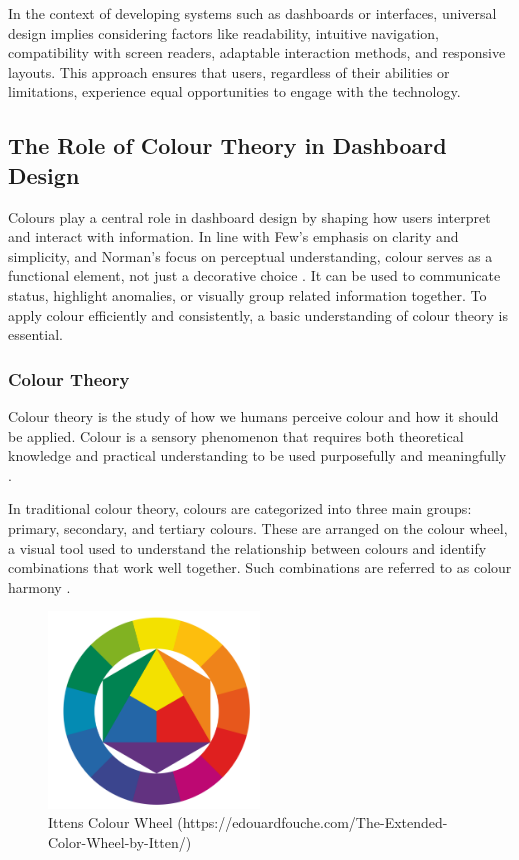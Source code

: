 In the context of developing systems such as dashboards or interfaces, universal design implies considering factors like readability, intuitive navigation, compatibility with screen readers, adaptable interaction methods, and responsive layouts. This approach ensures that users, regardless of their abilities or limitations, experience equal opportunities to engage with the technology.


\subsection{The Role of Colour Theory in Dashboard Design}
\label{subsec:colour_theory}

Colours play a central role in dashboard design by shaping how users interpret and interact with information. In line with Few's emphasis on clarity and simplicity, and Norman's focus on perceptual understanding, colour serves as a functional element, not just a decorative choice \autocite{Figma}. It can be used to communicate status, highlight anomalies, or visually group related information together. To apply colour efficiently and consistently, a basic understanding of colour theory is essential.

\subsubsection{Colour Theory}
\label{subsubsec:col_theo}

Colour theory is the study of how we humans perceive colour and how it should be applied. Colour is a sensory phenomenon that requires both theoretical knowledge and practical understanding to be used purposefully and meaningfully \autocite{snl}.

In traditional colour theory, colours are categorized into three main groups: primary, secondary, and tertiary colours. These  are arranged on the colour wheel, a visual tool used to understand the relationship between colours and identify combinations that work well together. Such combinations are referred to as colour harmony \autocite{Canva}.

\begin{figure}[H]
        \centering
        \includegraphics[width=0.5\textwidth]{figures/Ittens colour wheel.png}
        \caption{Ittens Colour Wheel (https://edouardfouche.com/The-Extended-Color-Wheel-by-Itten/)}
        \label{sfig:colour_wheel}
\end{figure}

